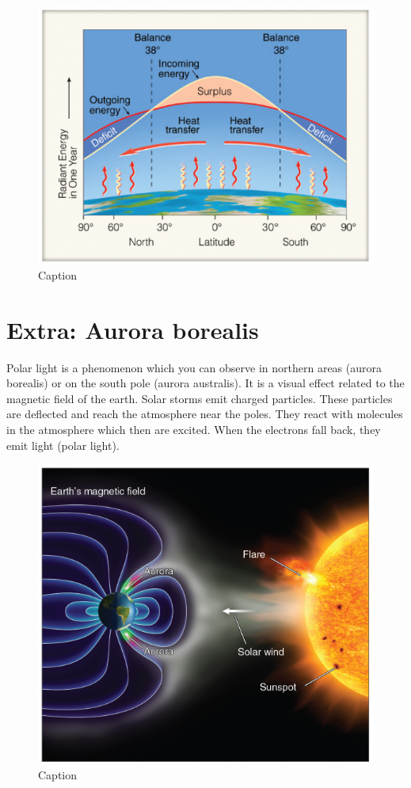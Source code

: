 \documentclass[12pt,oneside]{book}
\begin{document}
\begin{figure}

{\centering \includegraphics[width=0.7\linewidth]{figures/Figure143} 

}

\caption{Caption}\label{fig:EnergyBudget5}
\end{figure}

\section{Extra: Aurora borealis}\label{extra-aurora-borealis}

Polar light is a phenomenon which you can observe in northern areas
(aurora borealis) or on the south pole (aurora australis). It is a
visual effect related to the magnetic field of the earth. Solar storms
emit charged particles. These particles are deflected and reach the
atmosphere near the poles. They react with molecules in the atmosphere
which then are excited. When the electrons fall back, they emit light
(polar light).

\begin{figure}

{\centering \includegraphics[width=0.5\linewidth]{figures/Figure144} 

}

\caption{Caption}\label{fig:borealis}
\end{figure}
\end{document}
